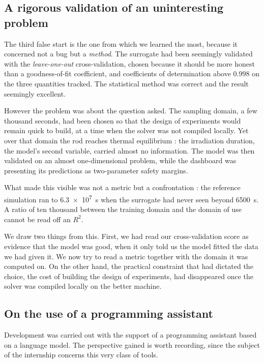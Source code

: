 \documentclass[12pt,a4paper]{report}
\begin{document}
\subsection{A rigorous validation of an uninteresting problem}

The third false start is the one from which we learned the most, because it
concerned not a bug but a \emph{method}. The surrogate had been seemingly validated with the
\textit{leave-one-out} cross-validation, chosen because it should be more
honest than a goodness-of-fit coefficient, and coefficients of determination
above $0.998$ on the three quantities tracked. The statistical method was
correct and the result seemingly excellent.

However the problem was about the question asked. The sampling domain, a few
thousand seconds, had been chosen so that the design of experiments would
remain quick to build, at a time when the solver was not compiled locally. Yet
over that domain the rod reaches thermal equilibrium : the irradiation duration,
the model's second variable, carried almost no information. The model was then validated on an almost one-dimensional problem, while the
dashboard was presenting its predictions as two-parameter safety margins.

What made this visible was not a metric but a confrontation : the reference
simulation ran to \SI{6.3e7}{\second} when the surrogate had never seen beyond
\SI{6500}{\second}. A ratio of ten thousand between the training domain and the
domain of use cannot be read off an $R^2$.

We draw two things from this. First, we had read our cross-validation score as
evidence that the model was good, when it only told us the model fitted the data
we had given it. We now try to read a metric together with the domain it was
computed on. On the other hand, the practical
constraint that had dictated the choice, the cost of building the design of
experiments, had disappeared once the solver was compiled locally on the better machine.

\subsection{On the use of a programming assistant}

Development was carried out with the support of a programming assistant based on
a language model. The perspective gained is worth recording, since the subject
of the internship concerns this very class of tools.
\end{document}

